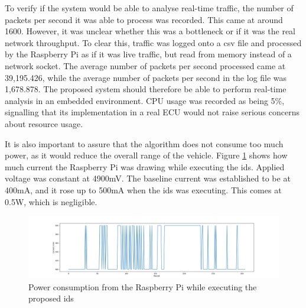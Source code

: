 To verify if the system would be able to analyse real-time traffic, the number of packets per second it was able to process was recorded. This came at around 1600. However, it was unclear whether this was a bottleneck or if it was the real network throughput. To clear this, traffic was logged onto a \gls{csv} file and processed by the Raspberry Pi as if it was live traffic, but read from memory instead of a network socket. The average number of packets per second processed came at 39,195.426, while the average number of packets per second in the log file was 1,678.878. The proposed system should therefore be able to perform real-time analysis in an embedded environment. CPU usage was recorded as being 5\%, signalling that its implementation in a real ECU would not raise serious concerns about resource usage.\par
It is also important to assure that the algorithm does not consume too much power, as it would reduce the overall range of the vehicle. Figure \ref{fig:powerdraw} shows how much current the Raspberry Pi was drawing while executing the \gls{ids}. Applied voltage was constant at 4900mV. The baseline current was established to be at 400mA, and it rose up to 500mA when the \gls{ids} was executing. This comes at 0.5W, which is negligible.

\begin{figure}
    \centering
    \includegraphics[width = \linewidth]{img/parts/app/powerdraw.png}
    \caption{Power consumption from the Raspberry Pi while executing the proposed \gls{ids}}
    \label{fig:powerdraw}
\end{figure}